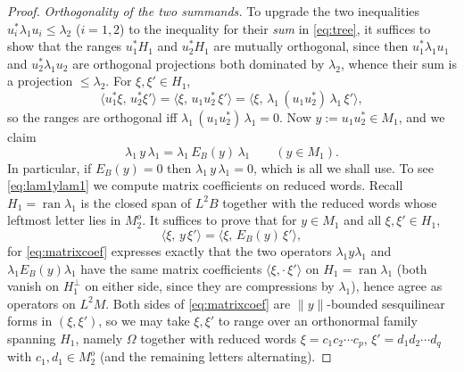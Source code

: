 \documentclass[a4paper, 11pt, reqno]{amsart}
\numberwithin{equation}{section}
\theoremstyle{plain}
\theoremstyle{remark}
\theoremstyle{definition}
\begin{document}
\begin{proof}
\emph{Orthogonality of the two summands.} To upgrade the two inequalities $u_i^*\lambda_1 u_i\le\lambda_2$ ($i=1,2$) to the inequality for their \emph{sum} in \eqref{eq:tree}, it suffices to show that the ranges $u_1^*H_1$ and $u_2^*H_1$ are mutually orthogonal, since then $u_1^*\lambda_1 u_1$ and $u_2^*\lambda_1 u_2$ are orthogonal projections both dominated by $\lambda_2$, whence their sum is a projection $\le\lambda_2$. For $\xi,\xi'\in H_1$,
\[
\langle u_1^*\xi,\,u_2^*\xi'\rangle=\langle\xi,\,u_1u_2^*\,\xi'\rangle=\langle\xi,\,\lambda_1\,(u_1u_2^*)\,\lambda_1\,\xi'\rangle,
\]
so the ranges are orthogonal iff $\lambda_1\,(u_1u_2^*)\,\lambda_1=0$. Now $y:=u_1u_2^*\in M_1$, and we claim
\begin{equation}\label{eq:lam1ylam1}
\lambda_1\,y\,\lambda_1=\lambda_1\,E_B(y)\,\lambda_1\qquad(y\in M_1).
\end{equation}
In particular, if $E_B(y)=0$ then $\lambda_1\,y\,\lambda_1=0$, which is all we shall use.
To see \eqref{eq:lam1ylam1} we compute matrix coefficients on reduced words. Recall $H_1=\operatorname{ran}\lambda_1$ is the closed span of $L^2B$ together with the reduced words whose leftmost letter lies in $M_2^o$. It suffices to prove that for $y\in M_1$ and all $\xi,\xi'\in H_1$,
\begin{equation}\label{eq:matrixcoef}
\langle\xi,\,y\,\xi'\rangle=\langle\xi,\,E_B(y)\,\xi'\rangle ,
\end{equation}
for \eqref{eq:matrixcoef} expresses exactly that the two operators $\lambda_1 y\lambda_1$ and $\lambda_1 E_B(y)\lambda_1$ have the same matrix coefficients $\langle\xi,\cdot\,\xi'\rangle$ on $H_1=\operatorname{ran}\lambda_1$ (both vanish on $H_1^\perp$ on either side, since they are compressions by $\lambda_1$), hence agree as operators on $L^2M$. Both sides of \eqref{eq:matrixcoef} are $\|y\|$-bounded sesquilinear forms in $(\xi,\xi')$, so we may take $\xi,\xi'$ to range over an orthonormal family spanning $H_1$, namely $\Omega$ together with reduced words $\xi=c_1c_2\cdots c_p$, $\xi'=d_1d_2\cdots d_q$ with $c_1,d_1\in M_2^o$ (and the remaining letters alternating).


\end{proof}
\end{document}
